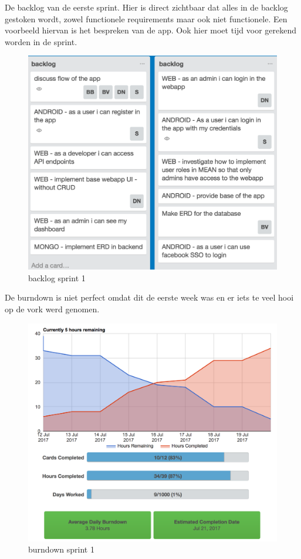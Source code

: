 De backlog van de eerste sprint. Hier is direct zichtbaar dat alles in de backlog gestoken wordt, zowel functionele requirements maar ook niet functionele. Een voorbeeld hiervan is het bespreken van de app. Ook hier moet tijd voor gerekend worden in de sprint.

\begin{figure}[H]
\centering
\includegraphics[width=15cm]{img/backlog_week1.png}
\caption{backlog sprint 1}
\end{figure}

De burndown is niet perfect omdat dit de eerste week was en er iets te veel hooi op de vork werd genomen. 

\begin{figure}[H]
	\centering
\includegraphics[width=15cm]{img/burndown_week1.png}
\caption{burndown sprint 1}
\end{figure}

